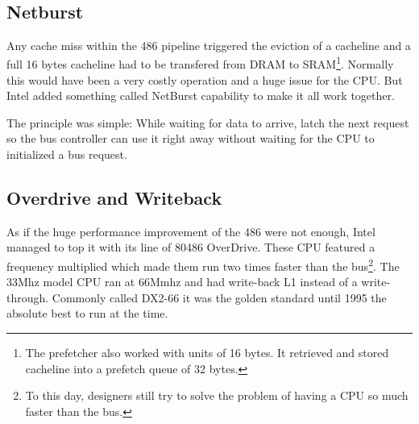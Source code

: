 \par
{}\\
\par




\subsection{Netburst}
Any cache miss within the 486 pipeline triggered the eviction of a cacheline and a full 16 bytes cacheline had to be transfered from DRAM to SRAM\footnote{The prefetcher also worked with units of 16 bytes. It retrieved and stored cacheline into a prefetch queue of 32 bytes.}. Normally this would have been a very costly operation and a huge issue for the CPU. But Intel added something called NetBurst capability to make it all work together.\\
\par
The principle was simple: While waiting for data to arrive, latch the next request so the bus controller can use it right away without waiting for the CPU to initialized a bus request.\\
\par
{}







\subsection{Overdrive and Writeback}
As if the huge performance improvement of the 486 were not enough, Intel managed to top it with its line of 80486 OverDrive. These CPU featured a frequency multiplied which made them run two times faster than the bus\footnote{To this day, designers still try to solve the problem of having a CPU so much faster than the bus.}. The 33Mhz model CPU ran at 66Mmhz and had write-back L1 instead of a write-through. Commonly called DX2-66 it was the golden standard until 1995 the absolute best to run \doom{}at the time.\\
\par 
{}%
\par

